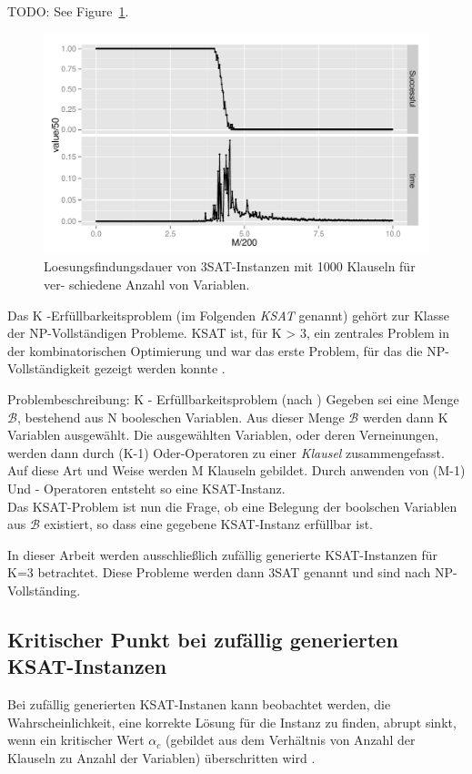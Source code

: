 \documentclass[runningheads]{llncs}
\begin{document}
TODO: See Figure~\ref{fig:distr}.
\begin{figure}
\centering
\includegraphics[width=.8\textwidth]{../material_2/plot_sat.pdf}
\caption{Loesungsfindungsdauer von 3SAT-Instanzen mit 1000 Klauseln für ver- schiedene Anzahl von Variablen.} \label{fig:distr}
\end{figure}

Das K -Erfüllbarkeitsproblem (im Folgenden\emph{ KSAT} genannt) gehört zur Klasse der NP-Vollständigen Probleme. KSAT ist, für K > 3, ein zentrales Problem in der kombinatorischen Optimierung und war das erste Problem, für das die NP-Vollständigkeit gezeigt werden konnte \cite{mezard2002random}.

Problembeschreibung: K - Erfüllbarkeitsproblem (nach  \cite{mezard2002random})
Gegeben sei eine Menge $\mathcal{B}$, bestehend aus N booleschen Variablen. Aus dieser Menge $\mathcal{B}$ werden dann K Variablen ausgewählt. Die ausgewählten Variablen, oder deren Verneinungen, werden dann durch (K-1) Oder-Operatoren zu einer \emph {Klausel} zusammengefasst. Auf diese Art und Weise werden M Klauseln gebildet. Durch anwenden von (M-1) Und - Operatoren entsteht so eine KSAT-Instanz.\\Das KSAT-Problem ist nun die Frage, ob eine Belegung der boolschen Variablen aus $\mathcal{B}$ existiert, so dass eine gegebene KSAT-Instanz erfüllbar ist.

In dieser Arbeit werden ausschließlich zufällig generierte KSAT-Instanzen für K=3 betrachtet. Diese Probleme werden dann 3SAT genannt und sind nach \cite{cook1971complexity} NP-Vollständing.

\subsection{Kritischer Punkt bei zufällig generierten KSAT-Instanzen}\label{krit:sat}
Bei zufällig generierten KSAT-Instanen kann beobachtet werden, die Wahrscheinlichkeit, eine korrekte Lösung für die Instanz zu finden, abrupt sinkt, wenn ein kritischer Wert $\alpha_{c}$ (gebildet aus dem Verhältnis von Anzahl der Klauseln zu Anzahl der Variablen) überschritten wird \cite{monasson1996entropy}.
\end{document}
